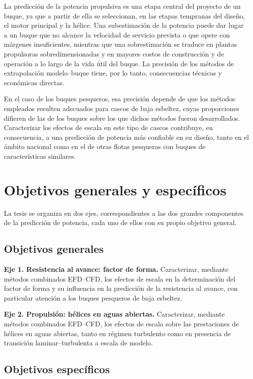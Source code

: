 La predicción de la potencia propulsiva es una etapa central del proyecto de
un buque, ya que a partir de ella se seleccionan, en las etapas tempranas del
diseño, el motor principal y la hélice. Una subestimación de la potencia puede
dar lugar a un buque que no alcance la velocidad de servicio prevista o que
opere con márgenes insuficientes, mientras que una sobrestimación se traduce
en plantas propulsoras sobredimensionadas y en mayores costos de construcción
y de operación a lo largo de la vida útil del buque. La precisión de los
métodos de extrapolación modelo--buque tiene, por lo tanto, consecuencias
técnicas y económicas directas.

En el caso de los buques pesqueros, esa precisión depende de que los métodos
empleados resulten adecuados para cascos de baja esbeltez, cuyas proporciones
difieren de las de los buques sobre los que dichos métodos fueron
desarrollados. Caracterizar los efectos de escala en este tipo de cascos
contribuye, en consecuencia, a una predicción de potencia más confiable en
su diseño, tanto en el ámbito nacional como en el de otras flotas pesqueras
con buques de características similares.

\section{Objetivos generales y específicos}

La tesis se organiza en dos ejes, correspondientes a las dos grandes
componentes de la predicción de potencia, cada uno de ellos con su propio
objetivo general.

\subsection*{Objetivos generales}

\textbf{Eje 1. Resistencia al avance: factor de forma.} Caracterizar,
mediante métodos combinados EFD--CFD, los efectos de escala en la
determinación del factor de forma y su influencia en la predicción de la
resistencia al avance, con particular atención a los buques pesqueros de baja
esbeltez.

\textbf{Eje 2. Propulsión: hélices en aguas abiertas.} Caracterizar,
mediante métodos combinados EFD--CFD, los efectos de escala sobre las
prestaciones de hélices en aguas abiertas, tanto en régimen turbulento como
en presencia de transición laminar--turbulenta a escala de modelo.

\subsection*{Objetivos específicos}

